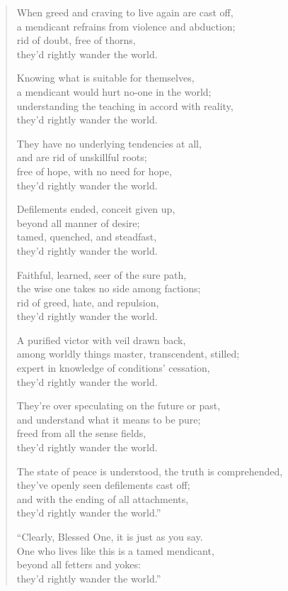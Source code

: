 \documentclass[12pt,openany]{book}%
\begin{document}
\begin{verse}
When greed and craving to live again are cast off, \\
a mendicant refrains from violence and abduction; \\
rid of doubt, free of thorns, \\
they’d rightly wander the world. 

Knowing what is suitable for themselves, \\
a mendicant would hurt no-one in the world; \\
understanding the teaching in accord with reality, \\
they’d rightly wander the world. 

They have no underlying tendencies at all, \\
and are rid of unskillful roots; \\
free of hope, with no need for hope, \\
they’d rightly wander the world. 

Defilements ended, conceit given up, \\
beyond all manner of desire; \\
tamed, quenched, and steadfast, \\
they’d rightly wander the world. 

Faithful, learned, seer of the sure path, \\
the wise one takes no side among factions; \\
rid of greed, hate, and repulsion, \\
they’d rightly wander the world. 

A purified victor with veil drawn back, \\
among worldly things master, transcendent, stilled; \\
expert in knowledge of conditions’ cessation, \\
they’d rightly wander the world. 

They’re over speculating on the future or past, \\
and understand what it means to be pure; \\
freed from all the sense fields, \\
they’d rightly wander the world. 

The state of peace is understood, the truth is comprehended, \\
they’ve openly seen defilements cast off; \\
and with the ending of all attachments, \\
they’d rightly wander the world.” 

“Clearly, Blessed One, it is just as you say. \\
One who lives like this is a tamed mendicant, \\
beyond all fetters and yokes: \\
they’d rightly wander the world.” 

%
\end{verse}
\end{document}
